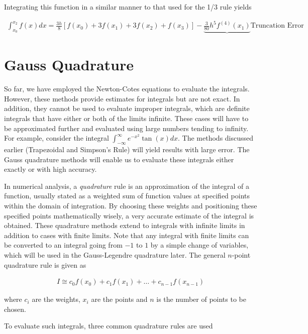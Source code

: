 \documentclass[book.tex]{subfiles}
\begin{document}
Integrating this function in a similar manner to that used for the 1/3 rule yields

\begin{align}
\int_{x_0}^{x_2}f(x)dx =  \frac{3h}{8}[f(x_0) + 3f(x_1) + 3f(x_2) + f(x_3)] - \underbrace{\frac{3}{80}h^5f^{(4)}(x_1)}{\text{Truncation Error}}
\end{align}

\section{Gauss Quadrature}
So far, we have employed the Newton-Cotes equations to evaluate the integrals. However, these methods provide estimates for integrals but are not exact. In addition, they cannot be used to evaluate improper integrals, which are definite integrals that have either or both of the limits infinite. These cases will have to be approximated further and evaluated using large numbers tending to infinity. For example, consider the integral $\int_{-\infty}^{\infty}e^{-x^2}\tan(x)dx$. The methods discussed earlier (Trapezoidal and Simpson's Rule) will yield results with large error. The Gauss quadrature methods will enable us to evaluate these integrals either exactly or with high accuracy.

In numerical analysis, a \textit{quadrature} rule is an approximation of the integral of a function, usually stated as a weighted sum of function values at specified points within the domain of integration. By choosing these weights and positioning these specified points mathematically wisely, a very accurate estimate of the integral is obtained. These quadrature methods extend to integrals with infinite limits in addition to cases with finite limits. Note that any integral with finite limits can be converted to an integral going from $-1$ to $1$ by a simple change of variables, which will be used in the Gauss-Legendre quadrature later. The general $n$-point quadrature rule is given as

\begin{align}
I \cong c_0f(x_0) + c_1f(x_1) + \dots + c_{n-1}f(x_{n-1})
\end{align}

where $c_i$ are the weights, $x_i$ are the points and $n$ is the number of points to be chosen.

To evaluate such integrals, three common quadrature rules are used
\end{document}
